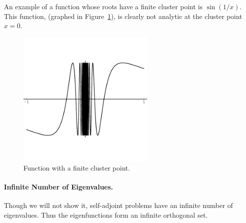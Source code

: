 An example of a function whose roots have a finite cluster point is
$\sin(1/x)$.  This function, (graphed in Figure~\ref{fin_clust}), is
clearly not analytic at the cluster point $x = 0$.



\begin{figure}[h!]
  \begin{center}
    \includegraphics[width=0.6\textwidth]{ode/self_adjoint_bvp/finclust}
  \end{center}
  \caption{Function with a finite cluster point.}
  \label{fin_clust}
\end{figure}









\paragraph{Infinite Number of Eigenvalues.}
Though we will not show it, self-adjoint problems have an infinite number
of eigenvalues. Thus the eigenfunctions form an infinite orthogonal set.







